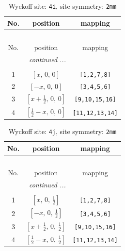 \documentclass[fleqn,8pt]{jsarticle}
\begin{document}
\begin{longtable}{ccc}
\caption{Wyckoff site: {\tt 4i}, site symmetry: {\tt 2mm}}
 \\
 \hline \hline
No. & position & mapping \\ \hline \endfirsthead

\multicolumn{2}{l}{\tablename\ \thetable{}} \\
 \hline \hline
No. & position & mapping \\ \hline \endhead

 \hline \hline
\multicolumn{2}{r}{\footnotesize\it continued ...} \\ \endfoot

 \hline \hline
\multicolumn{2}{r}{} \\ \endlastfoot

1 & $\left[ x,\, 0,\, 0 \right]$ & {\tt [1,2,7,8]} \\ \hline
2 & $\left[ - x,\, 0,\, 0 \right]$ & {\tt [3,4,5,6]} \\ \hline
3 & $\left[ x + \frac{1}{2},\, 0,\, 0 \right]$ & {\tt [9,10,15,16]} \\ \hline
4 & $\left[ \frac{1}{2} - x,\, 0,\, 0 \right]$ & {\tt [11,12,13,14]} \\
\end{longtable}
\renewcommand{\arraystretch}{1.2}
\begin{longtable}{ccc}
\caption{Wyckoff site: {\tt 4j}, site symmetry: {\tt 2mm}}
 \\
 \hline \hline
No. & position & mapping \\ \hline \endfirsthead

\multicolumn{2}{l}{\tablename\ \thetable{}} \\
 \hline \hline
No. & position & mapping \\ \hline \endhead

 \hline \hline
\multicolumn{2}{r}{\footnotesize\it continued ...} \\ \endfoot

 \hline \hline
\multicolumn{2}{r}{} \\ \endlastfoot

1 & $\left[ x,\, 0,\, \frac{1}{2} \right]$ & {\tt [1,2,7,8]} \\ \hline
2 & $\left[ - x,\, 0,\, \frac{1}{2} \right]$ & {\tt [3,4,5,6]} \\ \hline
3 & $\left[ x + \frac{1}{2},\, 0,\, \frac{1}{2} \right]$ & {\tt [9,10,15,16]} \\ \hline
4 & $\left[ \frac{1}{2} - x,\, 0,\, \frac{1}{2} \right]$ & {\tt [11,12,13,14]} \\
\end{longtable}
\end{document}
